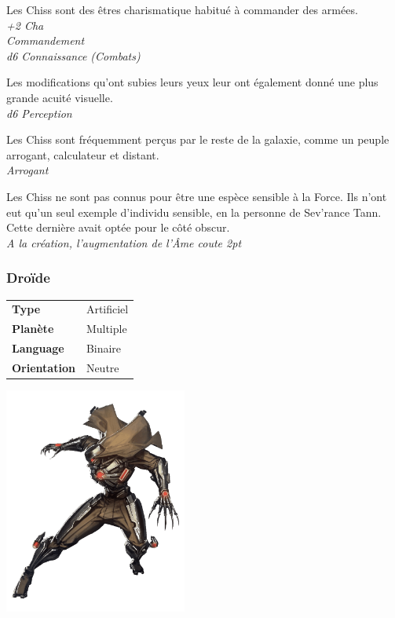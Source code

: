 \begin{description}[align=left]
\item [Charismatique] 			%
		Les Chiss sont des êtres charismatique habitué à commander des armées.\\
		\emph{+2 Cha}\\
		\emph{Commandement}\\
		\emph{d6 Connaissance (Combats)}
\item [Aquité visuelle] 		%
		Les modifications qu’ont subies leurs yeux leur ont également donné une plus grande acuité visuelle.\\
		\emph{d6 Perception}
\item [Arrogant] 				%
		Les Chiss sont fréquemment perçus par le reste de la galaxie, comme un peuple arrogant, calculateur et distant.\\
		\emph{Arrogant}
\item [Insensible à la Force] 		%
		Les Chiss ne sont pas connus pour être une espèce sensible à la Force. Ils n’ont eut qu’un seul exemple d’individu sensible, en la personne de Sev’rance Tann. Cette dernière avait optée pour le côté obscur.\\
		\emph{A la création, l'augmentation de l'\^Ame coute 2pt}
\end{description}

\subsubsection{Droïde}
\vspace{4\baselineskip}
\begin{tabular}{ l l }
	\textbf{Type} 			& Artificiel \\
   	\textbf{Planète} 		& Multiple \\
   	\textbf{Language} 		& Binaire \\
   	\textbf{Orientation} 	& Neutre \\
\end{tabular}

\vspace{-11\baselineskip}

\begin{flushright}
\includegraphics[width=6cm]{img/races/droide.png}
\end{flushright}
\vspace{-2\baselineskip}

